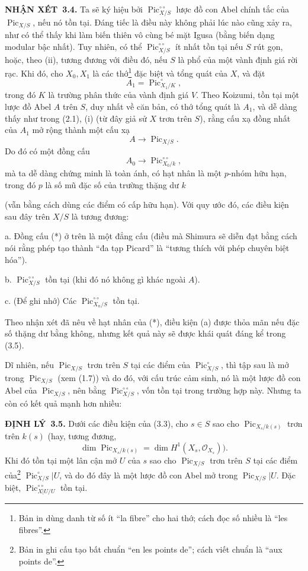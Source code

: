 \documentclass[11pt,twoside,openany]{book}
\numberwithin{equation}{section}
\newcommand{\src}[1]{%
  \phantomsection\hypertarget{src:\fgasourceid:#1}{}%
  \marginpar{\raggedleft\footnotesize\sffamily #1}%
}
\newcommand{\fgasourceid}{unset}
\newcommand{\result}[2]{\par\medskip\noindent\textbf{#1\if\relax\detokenize{#2}\relax\else\ #2\fi.}\quad}
\begin{document}
\result{NHẬN XÉT}{3.4} Ta sẽ ký hiệu bởi
$\operatorname{Pic}_{X/S}^{\circ\circ}$ lược đồ con Abel chính tắc của
$\operatorname{Pic}_{X/S}$, nếu nó tồn tại. Đáng tiếc là điều này không phải
lúc nào cũng xảy ra, như có thể thấy khi làm biến thiên vô cùng bé mặt Igusa
(bằng biến dạng modular bậc nhất). Tuy nhiên, có thể
$\operatorname{Pic}_{X/S}^{\circ\circ}$ ít nhất tồn tại nếu $S$ rút gọn,
hoặc, theo (ii), tương đương với điều đó, nếu $S$ là phổ của một vành định giá
rời rạc. Khi đó, cho $X_0,X_1$ là các thớ\footnote{Bản in dùng danh từ số ít
``la fibre'' cho hai thớ; cách đọc số nhiều là ``les
fibres''.} đặc biệt và tổng quát của $X$, và đặt
\[
A_1=\operatorname{Pic}_{X_1/K}^\circ,
\]
trong đó $K$ là trường phân thức của vành định giá $V$. Theo Koizumi, tồn tại
một lược đồ Abel $A$ trên $S$, duy nhất về căn bản, có thớ tổng quát là $A_1$,
và dễ dàng thấy như trong (2.1), (i) (từ đây giả sử $X$ trơn trên $S$), rằng
cấu xạ đồng nhất của $A_1$ mở rộng thành một cấu xạ
\[
A\longrightarrow\operatorname{Pic}_{X/S}.
\]
Do đó có một đồng cấu
\[
\tag{*}A_0\longrightarrow\operatorname{Pic}_{X_0/k}^{\circ\circ},
\]
mà ta dễ dàng chứng minh là toàn ánh, có hạt nhân là một $p$-nhóm hữu hạn,
trong đó $p$ là số mũ đặc số của trường thặng dư $k$
\src{239}
(vẫn bằng cách dùng các điểm có cấp hữu hạn). Với quy ước đó, các điều kiện
sau đây trên $X/S$ là tương đương:

\medskip
\noindent a. Đồng cấu (*) ở trên là một đẳng cấu (điều mà Shimura sẽ diễn đạt
bằng cách nói rằng phép tạo thành ``đa tạp Picard'' là ``tương thích với phép
chuyên biệt hóa'').

\noindent b. $\operatorname{Pic}_{X/S}^{\circ\circ}$ tồn tại (khi đó nó
không gì khác ngoài $A$).

\noindent c. (Để ghi nhớ) Các
$\operatorname{Pic}_{X_n/S}^{\circ\circ}$ tồn tại.

Theo nhận xét đã nêu về hạt nhân của (*), điều kiện (a) được thỏa mãn nếu đặc
số thặng dư bằng không, nhưng kết quả này sẽ được khái quát đáng kể trong
(3.5).

Dĩ nhiên, nếu $\operatorname{Pic}_{X/S}$ trơn trên $S$ tại các điểm của
$\operatorname{Pic}_{X/S}^\circ$, thì tập sau là mở trong
$\operatorname{Pic}_{X/S}$ (xem (1.7)) và do đó, với cấu trúc cảm sinh, nó là
một lược đồ con Abel của $\operatorname{Pic}_{X/S}$, nên bằng
$\operatorname{Pic}_{X/S}^{\circ\circ}$, vốn tồn tại trong trường hợp này.
Nhưng ta còn có kết quả mạnh hơn nhiều:

\result{ĐỊNH LÝ}{3.5} Dưới các điều kiện của (3.3), cho $s\in S$ sao cho
$\operatorname{Pic}_{X_s/k(s)}$ trơn trên $k(s)$ (hay, tương đương,
\[
\dim\operatorname{Pic}_{X_s/k(s)}=\dim H^1(X_s,\mathcal O_{X_s})).
\]
Khi đó tồn tại một lân cận mở $U$ của $s$ sao cho
$\operatorname{Pic}_{X/S}$ trơn trên $S$ tại các điểm của\footnote{Bản in ghi
cấu tạo bất chuẩn ``en les points de''; cách viết chuẩn là ``aux
points de''.} $\operatorname{Pic}_{X/S}^\circ|U$, và do đó đây là một lược
đồ con Abel mở trong $\operatorname{Pic}_{X/S}|U$. Đặc biệt,
$\operatorname{Pic}_{X|U/U}^{\circ\circ}$ tồn tại.
\end{document}
